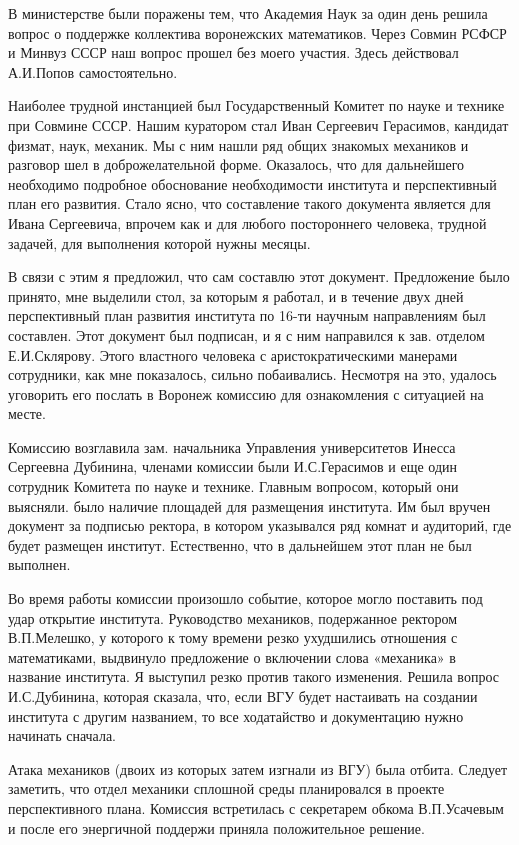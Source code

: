 В министерстве были поражены тем, что Академия Наук за один день решила вопрос о поддержке коллектива воронежских математиков. Через Совмин РСФСР и Минвуз СССР наш вопрос прошел без моего участия. Здесь действовал А.И.Попов самостоятельно.

Наиболее трудной инстанцией был Государственный Комитет по науке и технике при Совмине СССР. Нашим куратором стал Иван Сергеевич Герасимов, кандидат физмат, наук, механик. Мы с ним нашли ряд общих знакомых механиков и разговор шел в доброжелательной форме. Оказалось, что для дальнейшего необходимо подробное обоснование необходимости института и перспективный план его развития. Стало ясно, что составление такого документа является для Ивана Сергеевича, впрочем как и для любого постороннего человека, трудной задачей, для выполнения которой нужны месяцы.

В связи с этим я предложил, что сам составлю этот документ. Предложение было принято, мне выделили стол, за которым я работал, и в течение двух
дней перспективный план развития института по 16-ти научным направлениям был составлен. Этот документ был подписан, и я с ним направился к зав. отделом Е.И.Склярову. Этого властного человека с аристократическими манерами сотрудники, как мне показалось, сильно побаивались. Несмотря на это, удалось уговорить его послать в Воронеж комиссию для ознакомления с ситуацией на месте.

Комиссию возглавила зам. начальника Управления университетов Инесса Сергеевна Дубинина, членами комиссии были И.С.Герасимов и еще один сотрудник Комитета по науке и технике. Главным вопросом, который они выясняли. было наличие площадей для размещения института. Им был вручен документ за подписью ректора, в котором указывался ряд комнат и аудиторий, где будет размещен институт. Естественно, что в дальнейшем этот план не был выполнен.

Во время работы комиссии произошло событие, которое могло поставить под удар открытие института. Руководство механиков, подержанное ректором В.П.Мелешко, у которого к тому времени резко ухудшились отношения с математиками, выдвинуло предложение о включении слова «механика» в название института. Я выступил резко против такого изменения. Решила вопрос И.С.Дубинина, которая сказала, что, если ВГУ будет настаивать на создании института с другим названием, то все ходатайство и документацию нужно начинать сначала.

Атака механиков (двоих из которых затем изгнали из ВГУ) была отбита. Следует заметить, что отдел механики сплошной среды планировался в проекте перспективного плана. Комиссия встретилась с секретарем обкома В.П.Усачевым и после его энергичной поддержи приняла положительное решение.

